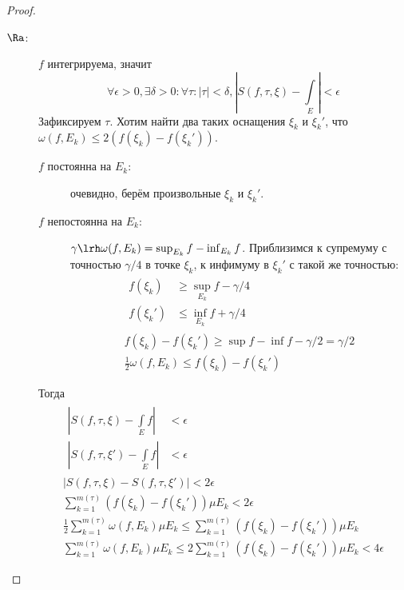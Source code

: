 \begin{proof}
	\begin{description}
	\item[$\Ra$:]
		$f$ интегрируема, значит
		\[
			\forall \epsilon > 0, \exists \delta > 0\colon \forall \tau\colon |\tau| < \delta,
				\left| S(f, \tau, \xi) - \int\limits_E \right| < \epsilon
		\]
		Зафиксируем $\tau$.
		Хотим найти два таких оснащения $\xi_k$ и $\xi_k'$, что $\omega(f, E_k) \le 2(f(\xi_k) - f(\xi_k'))$.
		\begin{description}
		\item[$f$ постоянна на $E_k$:] очевидно, берём произвольные $\xi_k$ и $\xi_k'$.
		\item[$f$ непостоянна на $E_k$:] $\gamma \lrh \omega(f, E_k) = \sup_{E_k} f - \inf_{E_k} f$.
			Приблизимся к супремуму с точностью $\gamma/4$ в точке $\xi_k$, к инфимуму в $\xi_k'$ с такой же точностью:
			\begin{gather*}
				\begin{aligned}
					f(\xi_k)  &\ge \sup_{E_k} f - \gamma / 4 \\
					f(\xi_k') &\le \inf_{E_k} f + \gamma / 4
				\end{aligned} \\
				f(\xi_k) - f(\xi_k') \ge \sup f - \inf f - \gamma/2 = \gamma/2 \\
				\frac12 \omega(f, E_k) \le f(\xi_k) - f(\xi_k')
			\end{gather*}
		\end{description}
		Тогда
		\begin{gather*}
			\begin{aligned}
				\left| S(f, \tau, \xi ) - \int\limits_E f \right| &< \epsilon \\
				\left| S(f, \tau, \xi') - \int\limits_E f \right| &< \epsilon
			\end{aligned} \\
			\left| S(f, \tau, \xi) - S(f, \tau, \xi') \right| < 2\epsilon \\
			\sum_{k=1}^{m(\tau)} \left( f(\xi_k) - f(\xi_k') \right) \mu E_k < 2\epsilon \\
			\frac12 \sum_{k=1}^{m(\tau)} \omega(f, E_k) \mu E_k \le \sum_{k=1}^{m(\tau)} \left( f(\xi_k) - f(\xi_k') \right) \mu E_k \\
			\sum_{k=1}^{m(\tau)} \omega(f, E_k) \mu E_k \le 2\sum_{k=1}^{m(\tau)} \left( f(\xi_k) - f(\xi_k') \right) \mu E_k < 4\epsilon
		\end{gather*}


\end{description}
\end{proof}

